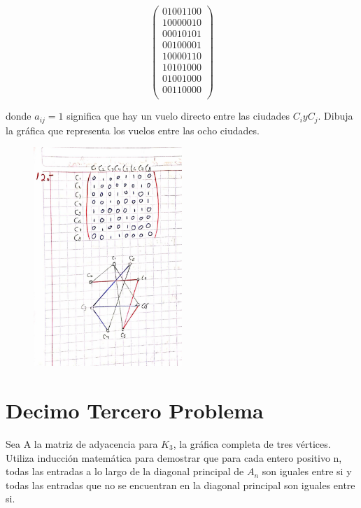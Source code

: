\documentclass[journal,12pt,onecolumn]{IEEEtran}                %
\theoremstyle{break}                                            %
\newcommand{\pVector}[1]                                        %
        { \ensuremath{\begin{pmatrix}#1\end{pmatrix}} }             %
\begin{document}
        \begin{equation*}
            \pVector {
                0 1 0 0 1 1 0 0 \\ 
                1 0 0 0 0 0 1 0 \\
                0 0 0 1 0 1 0 1 \\
                0 0 1 0 0 0 0 1 \\
                1 0 0 0 0 1 1 0 \\
                1 0 1 0 1 0 0 0 \\
                0 1 0 0 1 0 0 0 \\
                0 0 1 1 0 0 0 0 \\
            }
        \end{equation*}

        donde $a_{ij} = 1$ significa que hay un vuelo directo entre las ciudades $C_i y C_j$. 
        Dibuja la gráfica que representa los vuelos entre las ocho ciudades.

        \begin{figure}[h]
            \includegraphics[width=0.5\textwidth]{12}
        \end{figure}

    \clearpage
    \section*{Decimo Tercero Problema}
        Sea A la matriz de adyacencia para $K_3$, la gráfica completa de tres vértices. 
        Utiliza inducción matemática para demostrar que para cada entero positivo n, 
        todas las entradas a lo largo de la diagonal principal de $A_n$ son iguales 
        entre si y todas las entradas que no se encuentran en la diagonal principal
        son iguales entre si.
\end{document}
